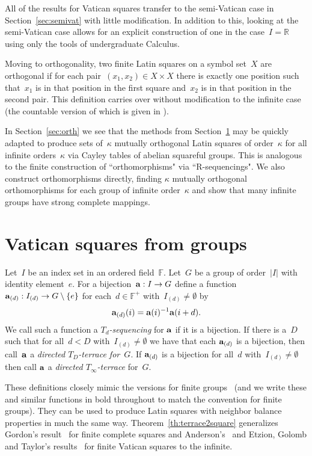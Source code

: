 \documentclass[12pt,a4paper]{article}
\newcommand{\R}{\mathbb{R}}
\newcommand{\F}{\mathbb{F}}
\renewcommand{\a}{\textup{\textbf{a}}}
\begin{document}
All of the results for Vatican squares transfer to the semi-Vatican case in Section~\ref{sec:semivat} with little modification.  In addition to this, looking at the semi-Vatican case allows for an explicit construction of one in the case~$I = \R$ using only the tools of undergraduate Calculus.


Moving to orthogonality, two finite Latin squares on a symbol set~$X$ are orthogonal if for  each pair~$(x_1, x_2) \in X \times X$ there is exactly one position such that~$x_1$ is in that position in the first square and~$x_2$ is in that position in the second pair.  This definition carries over without modification to the infinite case (the countable version of which is given in \cite[p.~116]{DK15}).

In Section~\ref{sec:orth} we see that the methods from Section~\ref{sec:cayley} may be quickly adapted to produce sets of~$\kappa$ mutually orthogonal Latin squares of order~$\kappa$ for all infinite orders~$\kappa$ via Cayley tables of abelian squareful groups.  This is analogous to the finite construction of ``orthomorphisms" via ``R-sequencings".   We also construct orthomorphisms directly, finding $\kappa$ mutually orthogonal orthomorphisms for each group of infinite order~$\kappa$ and show that many infinite groups have strong complete mappings.


\section{Vatican squares from groups}\label{sec:cayley}


Let~$I$ be an index set in an ordered field~$\F$.  Let~$G$ be a group of order~$|I|$ with identity element~$e$.  For a bijection~${\bf a}: I \rightarrow G$ define a function~${\bf a}_{(d)}: I_{(d)} \rightarrow G \setminus \{ e \}$ for each~$d \in \F^+$ with~$I_{(d)} \neq \emptyset$ by
$${\bf a}_{(d)}(i) = {\bf a}(i)^{-1}{\bf a}(i+d).$$ 
We call such a function a {\em $T_d$-sequencing} for $\a$ if it is a bijection.
If there is a~$D$ such that for all~$d < D$ with~$I_{(d)} \neq \emptyset$ we have that each ${\bf a}_{(d)}$ is a bijection, then call~${\bf a}$ a {\em directed $T_D$-terrace for~$G$}.  If ${\bf a}_{(d)}$ is a bijection for all~$d$  with~$I_{(d)} \neq \emptyset$ then call ${\bf a}$  a {\em directed $T_{\infty}$-terrace} for~$G$.

These definitions closely mimic the versions for finite groups~\cite{Anderson90} (and we write these and similar functions in bold throughout to match the convention for finite groups).   They can be used to produce Latin squares with neighbor balance properties in much the same way.  Theorem~\ref{th:terrace2square} generalizes Gordon's result~\cite{Gordon61} for finite complete squares and Anderson's~\cite{Anderson90} and Etzion, Golomb and Taylor's results~\cite{EGT89} for finite Vatican squares to the infinite.  
\end{document}
